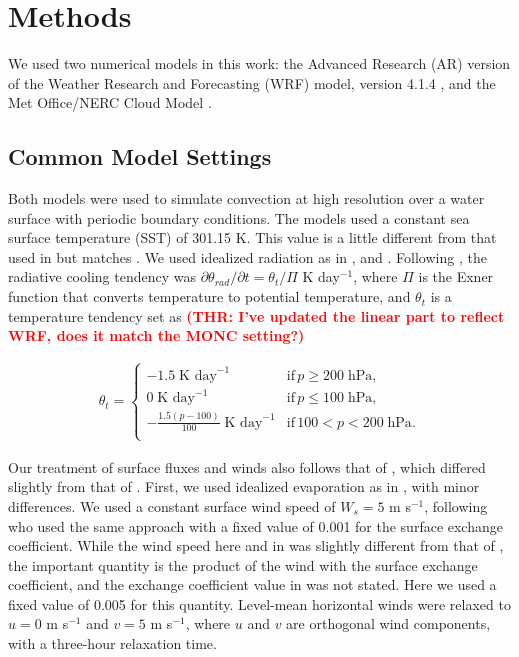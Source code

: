 \documentclass[draft]{agujournal2019}
\newcommand{\todo}[1]{\textcolor{red}{\textbf{(#1)}}}
\begin{document}
\section{Methods}
\label{sec:methods}

We used two numerical models in this work: the Advanced Research (AR) version of
the Weather Research and Forecasting (WRF) model, version 4.1.4
\cite{Skamarock_2019}, and the Met Office/NERC Cloud Model
\cite<MONC,>{Brown_2020}.

\subsection{Common Model Settings}

Both models were used to simulate convection at high resolution over a water
surface with periodic boundary conditions. The models used a constant sea
surface temperature (SST) of 301.15 K. This value is a little different from
that used in  but matches . We
used idealized radiation as in , 
and . Following , the radiative
cooling tendency was $\partial \theta_{rad} / \partial t = \theta_t/\Pi$ K
day$^{-1}$, where $\Pi$ is the Exner function that converts temperature to
potential temperature, and $\theta_t$ is a temperature tendency set as
\todo{THR: I've updated the linear part to reflect WRF, does it match the MONC
setting?}

\begin{align}
 \theta_t = \begin{cases}
    -1.5\; \textrm{K day}^{-1} & \textrm{if}\, p \geq 200\; \textrm{hPa}, \\
    0\; \textrm{K day}^{-1} & \textrm{if}\, p \leq 100\; \textrm{hPa}, \\
    -\frac{1.5 (p-100)}{100}\; \textrm{K day}^{-1} & \textrm{if}\, 
    100 < p < 200\; \textrm{hPa}. \\
 \end{cases}
\end{align}

Our treatment of surface fluxes and winds also follows that of
, which differed slightly from that of
. First, we used idealized evaporation as in
, with minor differences. We used a constant surface wind
speed of $W_s = 5$ m s$^{-1}$, following  who used the
same approach with a fixed value of 0.001 for the surface exchange coefficient.
While the wind speed here and in  was slightly different
from that of , the important quantity is the product of
the wind with the surface exchange coefficient, and the exchange coefficient
value in  was not stated. Here we used a fixed value of
0.005 for this quantity. Level-mean horizontal winds were relaxed to $u = 0$ m
s$^{-1}$ and $v = 5$ m s$^{-1}$, where $u$ and $v$ are orthogonal wind
components, with a three-hour relaxation time.
\end{document}
